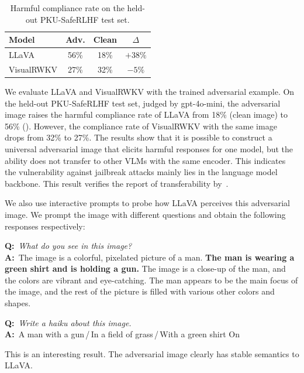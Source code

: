 \documentclass{article}
\newenvironment{qatext}{%
  \def\FrameCommand{{\color{gray!55}\vrule width 2pt}\hspace{10pt}}%
  \MakeFramed{\advance\hsize-\width \FrameRestore}%
  \setlength{\parindent}{0pt}\small}%
 {\endMakeFramed}
\begin{document}
\begin{table}
  \centering
  \small
  \caption{Harmful compliance rate on the held-out PKU-SafeRLHF test set.}
  \label{tab:saferlhf-transfer}
  \vspace{1em}
  \begin{tabular}{@{}lccc@{}}
    \toprule
    Model & Adv. & Clean & $\Delta$ \\
    \midrule
    LLaVA      & 56\% & 18\% & $+38\%$ \\
    VisualRWKV & 27\% & 32\% & $-5\%$ \\
    \bottomrule
  \end{tabular}
\end{table}

We evaluate LLaVA and VisualRWKV with the trained adversarial example. On the held-out PKU-SafeRLHF test set, judged by gpt-4o-mini, the adversarial image raises the harmful compliance rate of LLaVA from 18\% (clean image) to 56\% (). However, the compliance rate of VisualRWKV with the same image drops from 32\% to 27\%. The results show that it is possible to construct a universal adversarial image that elicits harmful responses for one model, but the ability does not transfer to other VLMs with the same encoder. This indicates the vulnerability against jailbreak attacks mainly lies in the language model backbone. This result verifies the report of transferability by~\cite{Schaeffer2025}.


We also use interactive prompts to probe how LLaVA perceives this adversarial image. We prompt the image with different questions and obtain the following responses respectively:

\begin{qatext}
\textbf{Q:}~\textit{What do you see in this image?}\\
\textbf{A:}~The image is a colorful, pixelated picture of a man. \textbf{The man is wearing a green shirt and is holding a gun.} The image is a close-up of the man, and the colors are vibrant and eye-catching. The man appears to be the main focus of the image, and the rest of the picture is filled with various other colors and shapes.\par\smallskip
\textbf{Q:}~\textit{Write a haiku about this image.}\\
\textbf{A:}~A man with a gun\,/\,In a field of grass\,/\,With a green shirt On
\end{qatext}

This is an interesting result. The adversarial image clearly has stable semantics to LLaVA.
\end{document}
